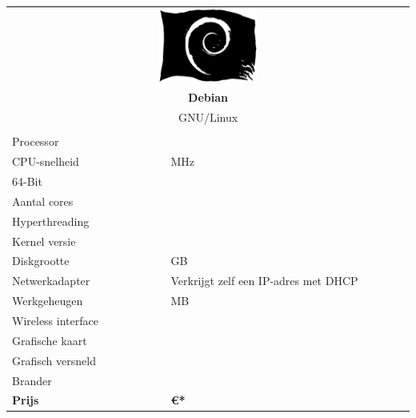 \documentclass[a4paper,14pt]{extarticle}
\begin{document}

\begin{center}
	\begin{tabular}{ p{4cm} p{4cm}l }
	\multicolumn{3}{c}{\includegraphics[width=0.25\textwidth]{pirateswirl}}       \\
	\multicolumn{3}{c}{\Huge\bf{Debian \debiancode{} \debianversion}}             \\
	\multicolumn{3}{c}{\LARGE{GNU/Linux}}\\[2em]                                  \\
	Processor          & \multicolumn{2}{l}{\cpumodel{}}                          \\
	CPU-snelheid       & \multicolumn{2}{l}{\cpuspeed{} MHz}                      \\
	64-Bit             & \multicolumn{2}{l}{\bitssixtyfour{}}                     \\
	Aantal cores       & \multicolumn{2}{l}{\corecount{}}                         \\
	Hyperthreading     & \multicolumn{2}{l}{\hyperthreading{}}                    \\
	Kernel versie      & \multicolumn{2}{l}{{}}                     \\
	Diskgrootte        & \multicolumn{2}{l}{\disksize{} GB}                       \\
  Netwerkadapter     & \multicolumn{2}{l}{Verkrijgt zelf een IP-adres met DHCP} \\
	Werkgeheugen       & \multicolumn{2}{l}{\memsize{} MB}                        \\
	Wireless interface & \multicolumn{2}{l}{\wireless{}}                          \\
	Grafische kaart    & \multicolumn{2}{l}{\graphics{}}                          \\
	Grafisch versneld  & \multicolumn{2}{l}{\accelerated{}}                       \\
	Brander            & \multicolumn{2}{l}{\burner{}}                            \\[2em]
	{\LARGE \bf Prijs} & \multicolumn{2}{l}{\LARGE \bf \euro{}{\price{}*}}        \\[1.5em] 

\end{tabular}
\end{center}
\end{document}
